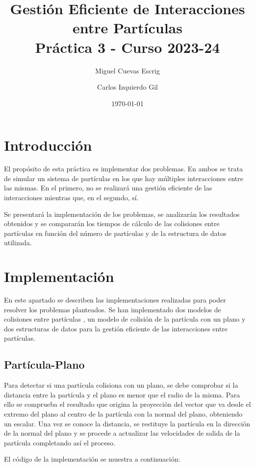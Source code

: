 \documentclass{article}
\title{Gestión Eficiente de Interacciones entre Partículas \\ \large{Práctica 3 - Curso 2023-24}}
\author{Miguel Cuevas Escrig \and Carlos Izquierdo Gil}
\date{\today}
\begin{document}
\maketitle
\tableofcontents
\section{Introducción}

El propósito de esta práctica es implementar dos problemas. En ambos se trata de simular un sistema de partículas en los que hay múltiples interacciones entre las mismas. En el primero, no se realizará una gestión eficiente de las interacciones mientras que, en el segundo, sí.

Se presentará la implementación de los problemas, se analizarán los resultados obtenidos y se compararán los tiempos de cálculo de las colisiones entre partículas en función del número de partículas y de la estructura de datos utilizada.


\section{Implementación}

En este apartado se describen las implementaciones realizadas para poder resolver los problemas planteados. Se han implementado dos modelos de colisiones entre partículas , un modelo de colisión de la partícula con un plano y dos estructuras de datos para la gestión eficiente de las interacciones entre partículas.
\subsection{Partícula-Plano}\label{sec:particula-plano}

Para detectar si una partícula colisiona con un plano, se debe comprobar si la distancia entre la partícula y el plano es menor que el radio de la misma. Para ello se comprueba el resultado que origina la proyección del vector que va desde el extremo del plano al centro de la partícula con la normal del plano, obteniendo un escalar. Una vez se conoce la distancia, se restituye la partícula en la dirección de la normal del plano y se procede a actualizar las velocidades de salida de la partícula completando así el proceso.

El código de la implementación se muestra a continuación:
\end{document}
